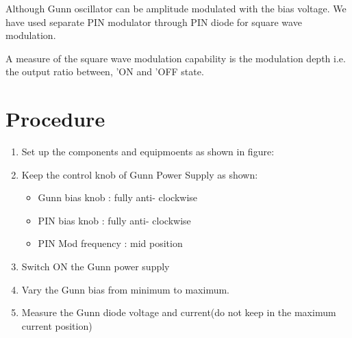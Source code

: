 \documentclass[11pt, a4paper]{article}
\begin{document}
Although Gunn oscillator can be amplitude modulated with the bias voltage. We have used separate PIN modulator through PIN diode for square wave modulation.

A measure of the square wave modulation capability is the modulation depth i.e. the output ratio between, 'ON and 'OFF state.

\section*{Procedure}
\begin{enumerate}
\item Set up the components and equipmoents as shown in figure:
\usetikzlibrary{shapes.misc,graphs}


\item Keep the control knob of Gunn Power Supply as shown:
\begin{itemize}
        \item Gunn bias knob	:	fully anti- clockwise
        \item PIN bias knob	:	fully anti- clockwise
        \item PIN Mod frequency	:	mid position
\end{itemize}

\item Switch ON the Gunn power supply 
\item Vary the Gunn bias from minimum to maximum.
\item Measure the Gunn diode voltage and current(do not keep in the maximum current position)

\end{enumerate}
\end{document}
